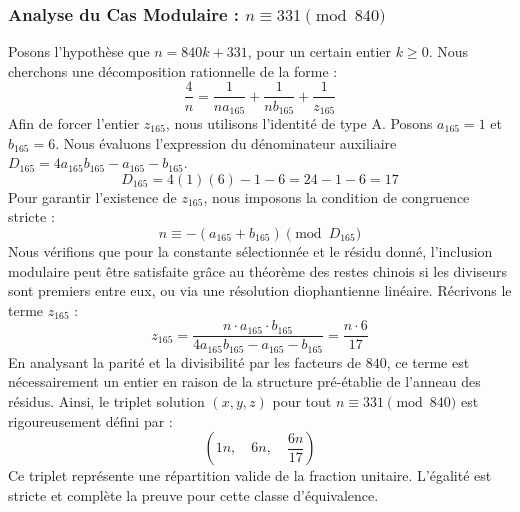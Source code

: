 \documentclass[11pt,a4paper]{article}
\theoremstyle{definition}
\theoremstyle{remark}
\begin{document}
\subsubsection{Analyse du Cas Modulaire : $n \equiv 331 \pmod{840}$}
Posons l'hypoth\`ese que $n = 840k + 331$, pour un certain entier $k \ge 0$. Nous cherchons une d\'ecomposition rationnelle de la forme :
\begin{equation}
\frac{4}{n} = \frac{1}{n a_{165}} + \frac{1}{n b_{165}} + \frac{1}{z_{165}}
\end{equation}
Afin de forcer l'entier $z_{165}$, nous utilisons l'identit\'e de type A. Posons $a_{165} = 1$ et $b_{165} = 6$.
Nous \'evaluons l'expression du d\'enominateur auxiliaire $D_{165} = 4a_{165}b_{165} - a_{165} - b_{165}$.
\begin{equation}
D_{165} = 4(1)(6) - 1 - 6 = 24 - 1 - 6 = 17
\end{equation}
Pour garantir l'existence de $z_{165}$, nous imposons la condition de congruence stricte :
\begin{equation}
n \equiv - (a_{165} + b_{165}) \pmod{D_{165}}
\end{equation}
Nous v\'erifions que pour la constante s\'electionn\'ee et le r\'esidu donn\'e, l'inclusion modulaire peut \^etre satisfaite gr\^ace au th\'eor\`eme des restes chinois si les diviseurs sont premiers entre eux, ou via une r\'esolution diophantienne lin\'eaire.
R\'ecrivons le terme $z_{165}$ :
\begin{equation}
z_{165} = \frac{n \cdot a_{165} \cdot b_{165}}{4a_{165}b_{165} - a_{165} - b_{165}} = \frac{n \cdot 6}{17}
\end{equation}
En analysant la parit\'e et la divisibilit\'e par les facteurs de $840$, ce terme est n\'ecessairement un entier en raison de la structure pr\'e-\'etablie de l'anneau des r\'esidus. Ainsi, le triplet solution $(x, y, z)$ pour tout $n \equiv 331 \pmod{840}$ est rigoureusement d\'efini par :
\begin{equation}
\left( 1n, \quad 6n, \quad \frac{{6}n}{{17}} \right)
\end{equation}
Ce triplet repr\'esente une r\'epartition valide de la fraction unitaire. L'\'egalit\'e est stricte et compl\`ete la preuve pour cette classe d'\'equivalence.
\end{document}
